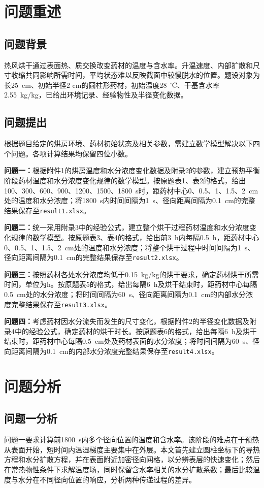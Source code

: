 \section{问题重述}
\subsection{问题背景}
热风烘干通过表面热、质交换改变药材的温度与含水率。升温速度、内部扩散和尺寸收缩共同影响所需时间，平均状态难以反映截面中较慢脱水的位置。题设对象为长25~cm、初始半径2 cm的圆柱形药材，初始温度28~℃、干基含水率2.55~kg/kg，已给出环境记录、经验物性及半径变化数据。

\subsection{问题提出}
根据题目给定的烘房环境、药材初始状态及相关参数，需建立数学模型解决以下四个问题。各项计算结果均保留四位小数。

\textbf{问题一：}根据附件1的烘房温度和水分浓度变化数据及附录2的参数，建立预热平衡阶段药材温度和水分浓度变化规律的数学模型。按原题表1、表2的格式，给出100、300、600、900、1200、1500、1800~s时，距药材中心0、0.5、1、1.5、2~cm处的温度和水分浓度；将1800~s内时间间隔为1~s、径向距离间隔为0.1~cm的完整结果保存至\texttt{result1.xlsx}。

\textbf{问题二：}统一采用附录3中的经验公式，建立整个烘干过程药材温度和水分浓度变化规律的数学模型。按原题表3、表4的格式，给出前3~h内每隔0.5~h，距药材中心0、0.5、1、1.5、2~cm处的温度和水分浓度；将整个烘干过程中时间间隔为1~s、径向距离间隔为0.1~cm的完整结果保存至\texttt{result2.xlsx}。

\textbf{问题三：}按照药材各处水分浓度均低于0.15~kg/kg的烘干要求，确定药材烘干所需时间，单位为h。按原题表5的格式，给出每隔6~h及烘干结束时，距药材中心每隔0.5~cm处的水分浓度；将时间间隔为60~s、径向距离间隔为0.1~cm的内部水分浓度完整结果保存至\texttt{result3.xlsx}。

\textbf{问题四：}考虑药材因水分流失而发生的尺寸变化，根据附件2的半径变化数据及附录4中的经验公式，确定药材的烘干时长。按原题表6的格式，给出每隔6~h及烘干结束时，距药材中心每隔0.5~cm处及药材表面的水分浓度；将时间间隔为60~s、径向距离间隔为0.1~cm的内部水分浓度完整结果保存至\texttt{result4.xlsx}。

\section{问题分析}
\subsection{问题一分析}
问题一要求计算前1800~s内多个径向位置的温度和含水率。该阶段的难点在于预热从表面开始，短时间内温湿梯度主要集中在外层。本文首先建立圆柱坐标下的导热方程和水分扩散方程，并在表面附近加密径向网格，以分辨表层的快速变化；然后在常热物性条件下求解温度场，同时保留含水率相关的水分扩散系数；最后比较温度与水分在不同径向位置的响应，分析两种传递过程的差异。

